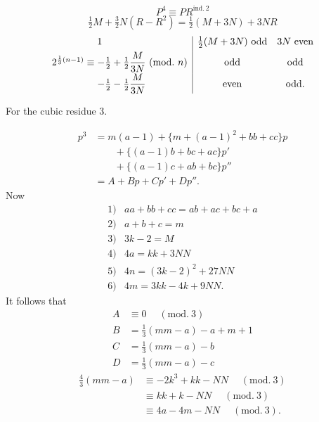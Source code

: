 \[P^4\equiv PR^{\mathrm{ind.}\,2}\]
\[\tfrac12 M+\tfrac32 N(R-R^2)=\tfrac12(M+3N)+3NR\]
\[\begin{array}{r@{}l|cc}
&1&\tfrac12(M+3N)\ \text{odd}&3N\ \text{even}\\[4pt]
2^{\frac13(n-1)}\equiv{}&-\tfrac12+\tfrac12\dfrac{M}{3N}\ (\mathrm{mod.}\ n)&\text{odd}&\text{odd}\\[5pt]
&-\tfrac12-\tfrac12\dfrac{M}{3N}&\text{even}&\text{odd.}
\end{array}\]
\begin{center}For the cubic residue 3.\end{center}
\[\begin{aligned}
p^3&=m(a-1)+\{m+(a-1)^2+bb+cc\}p\\
&\qquad+\{(a-1)b+bc+ac\}p'\\
&\qquad+\{(a-1)c+ab+bc\}p''\\
&=A+Bp+Cp'+Dp''.
\end{aligned}\]
\noindent Now
\[\begin{array}{rl}1)&aa+bb+cc=ab+ac+bc+a\\2)&a+b+c=m\\3)&3k-2=M\\4)&4a=kk+3NN\\5)&4n=(3k-2)^2+27NN\\6)&4m=3kk-4k+9NN.\end{array}\]
\noindent It follows that
\[\begin{aligned}A&\equiv0\quad\;(\mathrm{mod.}\ 3)\\ B&=\tfrac13(mm-a)-a+m+1\\ C&=\tfrac13(mm-a)-b\\D&=\tfrac13(mm-a)-c\end{aligned}\]
\[\begin{aligned}\tfrac43(mm-a)&\equiv-2k^3+kk-NN\quad\;(\mathrm{mod.}\ 3)\\
&\equiv kk+k-NN\quad\;(\mathrm{mod.}\ 3)\\
&\equiv4a-4m-NN\quad\;(\mathrm{mod.}\ 3).\end{aligned}\]
